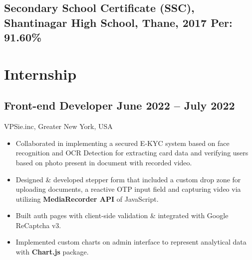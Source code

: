 \documentclass[a4,10pt]{article}
\newcommand{\subtext}[1]{
#1\par\vspace{-0.2cm}}
\newenvironment{zitemize}{
\begin{itemize}\itemsep0pt \parskip0pt \parsep1pt}
{\end{itemize}\vspace{-0.5cm}}
\begin{document}
\subsection*{Secondary School Certificate (SSC), {\normalsize \normalfont Shantinagar High School, Thane, 2017}  \hfill Per: 91.60\%} 
\vspace{0.2cm}


\section{Internship}

        

\subsection*{Front-end Developer \hfill June 2022 -- July 2022} 
\subtext{VPSie.inc, Greater New York, USA} 
    \begin{zitemize}
        \item Collaborated in implementing a secured E-KYC system based on face recognition and OCR Detection for extracting card data and verifying users based on photo present in document with recorded video.
        \item Designed \& developed stepper form that included a custom drop zone for uploading documents, a reactive OTP input field and capturing video via utilizing \textbf{MediaRecorder API} of JavaScript.
        \item Built auth pages with client-side validation \& integrated with Google ReCaptcha v3.
        \item Implemented custom charts on admin interface to represent analytical data with \textbf{Chart.js} package.
    \end{zitemize}
\end{document}

